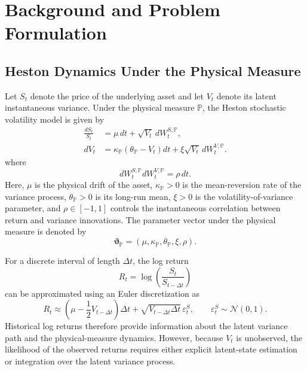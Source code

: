 \documentclass[sigconf,anonymous,review]{acmart}
\begin{document}
\section{Background and Problem Formulation}
\label{sec:background}

\subsection{Heston Dynamics Under the Physical Measure}
\label{sec:heston_physical}

Let \(S_t\) denote the price of the underlying asset and let \(V_t\) denote its latent instantaneous variance. Under the physical measure \(\mathbb{P}\), the Heston stochastic volatility model is given by \cite{heston1993}
%
\begin{align}
\frac{dS_t}{S_t}
&=
\mu\,dt
+
\sqrt{V_t}\,dW_t^{S,\mathbb{P}},
\label{eq:heston_p_asset}
\\
dV_t
&=
\kappa_{\mathbb{P}}
\left(
\theta_{\mathbb{P}}-V_t
\right)dt
+
\xi\sqrt{V_t}\,dW_t^{V,\mathbb{P}}.
\label{eq:heston_p_variance}
\end{align}
%
where
%
\begin{equation}
dW_t^{S,\mathbb{P}}
dW_t^{V,\mathbb{P}}
=
\rho\,dt.
\label{eq:heston_correlation}
\end{equation}
%
Here, \(\mu\) is the physical drift of the asset, \(\kappa_{\mathbb{P}}>0\) is the mean-reversion rate of the variance process, \(\theta_{\mathbb{P}}>0\) is its long-run mean, \(\xi>0\) is the volatility-of-variance parameter, and \(\rho\in[-1,1]\) controls the instantaneous correlation between return and variance innovations. The parameter vector under the physical measure is denoted by
%
\begin{equation}
\boldsymbol{\vartheta}_{\mathbb{P}}
=
\left(
\mu,
\kappa_{\mathbb{P}},
\theta_{\mathbb{P}},
\xi,
\rho
\right).
\end{equation}

For a discrete interval of length \(\Delta t\), the log return
%
\begin{equation}
R_t
=
\log
\left(
\frac{S_t}{S_{t-\Delta t}}
\right)
\end{equation}
%
can be approximated using an Euler discretization as
%
\begin{equation}
R_t
\approx
\left(
\mu-\frac{1}{2}V_{t-\Delta t}
\right)\Delta t
+
\sqrt{V_{t-\Delta t}\Delta t}\,
\varepsilon_t^{S},
\qquad
\varepsilon_t^{S}\sim\mathcal{N}(0,1).
\label{eq:return_observation}
\end{equation}
%
Historical log returns therefore provide information about the latent variance path and the physical-measure dynamics. However, because \(V_t\) is unobserved, the likelihood of the observed returns requires either explicit latent-state estimation or integration over the latent variance process.
\end{document}
